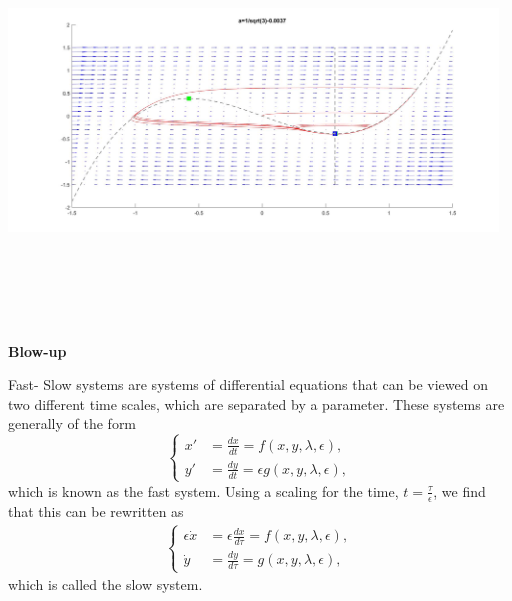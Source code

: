 \documentclass[15pt, a0paper, portrait]{tikzposter}
\begin{document}
\begin{columns}
{}

{
	\begin{tikzfigure}[h!]
		\centering
		\includegraphics[height=10cm,width=13cm]{../Code/behaviourswitch}
\end{tikzfigure}}

\end{columns}
\block{~}
{\textbf{Blow-up}\centering
	
	Fast- Slow systems are systems of differential equations that can be viewed on two different time scales, which are separated by a parameter.
	These systems are generally of the form
	\begin{equation*} 
	\begin{cases}
	x' &=\frac{dx}{dt}= f(x,y,\lambda, \epsilon),\\
	y' &= \frac{dy}{dt}= \epsilon g( x,y, \lambda, \epsilon),
	\end{cases}\label{FastS}
	\end{equation*}
	which is known as the fast system.
	Using a scaling for the time, $t = \frac{\tau}{\epsilon} $, we find that this can be rewritten as
	\begin{align*}
	\begin{cases}
	\epsilon \dot{x} &= \epsilon \frac{dx}{d \tau} = f(x,y,\lambda, \epsilon),\\
	\dot{y} & = \frac{dy}{d \tau} =  g( x,y, \lambda, \epsilon),
	\end{cases}\label{SlowS}
	\end{align*}
	which is called the slow system.
}
\end{document}
